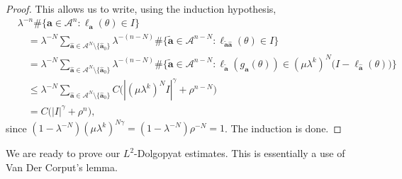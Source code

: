 \documentclass[11pt]{amsart}
\theoremstyle{plain}
\theoremstyle{definition}
\numberwithin{equation}{section}
\begin{document}
\begin{proof}
This allows us to write, using the induction hypothesis,
\begin{align*}
&\lambda^{-n} \#\{ \mathbf{a} \in \mathcal{A}^n : \ell_\mathbf{a}(\theta) \in I \} \\
&\quad = \lambda^{-N}
\sum_{\widehat{\mathbf{a}} \in \mathcal{A}^N \setminus \{\widehat{\mathbf{a}}_0\}}
\lambda^{-(n-N)}
\#\{ \tilde{\mathbf{a}} \in \mathcal{A}^{n-N} :
\ell_{\tilde{\mathbf{a}}\widehat{\mathbf{a}}}(\theta) \in I \} \\
&\quad = \lambda^{-N}
\sum_{\widehat{\mathbf{a}} \in \mathcal{A}^N \setminus \{\widehat{\mathbf{a}}_0\}}
\lambda^{-(n-N)}
\#\Big\{ \tilde{\mathbf{a}} \in \mathcal{A}^{n-N} :
\ell_{\tilde{\mathbf{a}}}(g_{\widehat{\mathbf{a}}}(\theta))
\in (\mu\lambda^k)^N
\big(I-\ell_{\widehat{\mathbf{a}}}(\theta)\big) \Big\} \\
&\quad \leq \lambda^{-N}
\sum_{\widehat{\mathbf{a}} \in \mathcal{A}^N \setminus \{\widehat{\mathbf{a}}_0\}}
C\Big( |(\mu\lambda^k)^N I|^\gamma + \rho^{n-N} \Big) \\
&\quad = C\big(|I|^\gamma+\rho^n\big),
\end{align*}
since $(1-\lambda^{-N})(\mu\lambda^k)^{N\gamma}
=(1-\lambda^{-N})\rho^{-N}=1$. The induction is done.
\end{proof}

We are ready to prove our $L^2$-Dolgopyat estimates. This is essentially a use of Van Der Corput's lemma.
\end{document}
